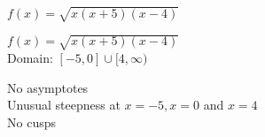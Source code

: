 {$f(x) = \sqrt{x(x + 5)(x - 4)}$}
{$f(x) = \sqrt{x(x + 5)(x - 4)}$\\
Domain: $[-5, 0] \cup [4, \infty)$\\
\begin{center}
\end{center}

No asymptotes\\
Unusual steepness at $x = -5, x = 0$ and $x = 4$\\
No cusps\\

\begin{center}
\end{center}}


